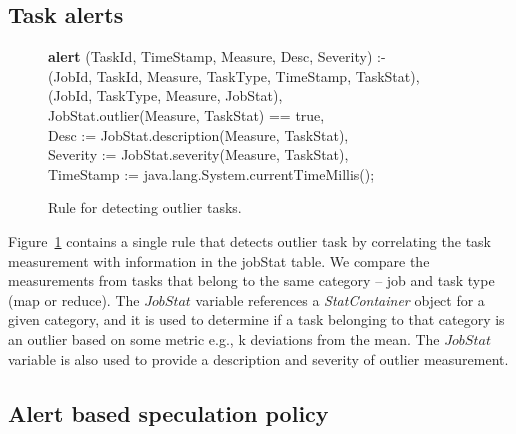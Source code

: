 \subsection{Task alerts} 

\begin{figure}
\ssp
\centering
\begin{boxedminipage}{\linewidth}
{\bf alert} (TaskId, TimeStamp, Measure, Desc, Severity) :- \\
(JobId, TaskId, Measure, TaskType, TimeStamp, TaskStat), \\
(JobId, TaskType, Measure, JobStat),  \\
\datalogspace JobStat.outlier(Measure, TaskStat) == true, \\
\datalogspace Desc := JobStat.description(Measure, TaskStat), \\
\datalogspace Severity := JobStat.severity(Measure, TaskStat), \\
\datalogspace TimeStamp := java.lang.System.currentTimeMillis(); \\
\end{boxedminipage}
\caption{\label{ch:hop:fig:outlier} Rule for detecting outlier tasks. }
\end{figure}

Figure~\ref{ch:hop:fig:outlier} contains a single rule that detects outlier task by correlating the
task measurement with information in the jobStat table. We compare the measurements from
tasks that belong to the same category -- job and task type (map or reduce). 
The $JobStat$ variable references a {\em StatContainer} object for a given category, and it
is used to determine if a task belonging to that category is an outlier based on some 
metric e.g., k deviations from the mean. The $JobStat$ variable is also used to provide a 
description and severity of outlier measurement. 

\subsection{Alert based speculation policy} 
\label{ch:hop:sec:speculation}

